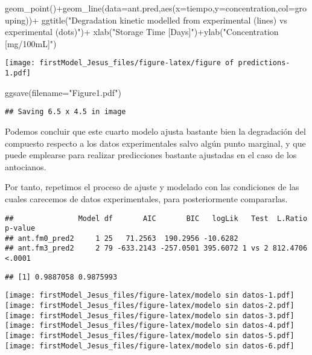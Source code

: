 \documentclass[
]{article}
\newenvironment{Shaded}{\begin{snugshade}}{\end{snugshade}}
\newcommand{\AttributeTok}[1]{\textcolor[rgb]{0.77,0.63,0.00}{#1}}
\newcommand{\FunctionTok}[1]{\textcolor[rgb]{0.00,0.00,0.00}{#1}}
\newcommand{\NormalTok}[1]{#1}
\newcommand{\SpecialCharTok}[1]{\textcolor[rgb]{0.00,0.00,0.00}{#1}}
\newcommand{\StringTok}[1]{\textcolor[rgb]{0.31,0.60,0.02}{#1}}
\begin{document}
\begin{Shaded}
\begin{Highlighting}[]
  \FunctionTok{geom\_point}\NormalTok{()}\SpecialCharTok{+}\FunctionTok{geom\_line}\NormalTok{(}\AttributeTok{data=}\NormalTok{ant.pred,}\FunctionTok{aes}\NormalTok{(}\AttributeTok{x=}\NormalTok{tiempo,}\AttributeTok{y=}\NormalTok{concentration,}\AttributeTok{col=}\NormalTok{grouping))}\SpecialCharTok{+}
  \FunctionTok{ggtitle}\NormalTok{(}\StringTok{"Degradation kinetic modelled from experimental (lines) vs experimental (dots)"}\NormalTok{)}\SpecialCharTok{+}
  \FunctionTok{xlab}\NormalTok{(}\StringTok{"Storage Time [Days]"}\NormalTok{)}\SpecialCharTok{+}\FunctionTok{ylab}\NormalTok{(}\StringTok{"Concentration [mg/100mL]"}\NormalTok{)}
\end{Highlighting}
\end{Shaded}

\texttt{[image: firstModel\_Jesus\_files/figure-latex/figure of predictions-1.pdf]}

\begin{Shaded}
\begin{Highlighting}[]
\FunctionTok{ggsave}\NormalTok{(}\AttributeTok{filename=}\StringTok{"Figure1.pdf"}\NormalTok{)}
\end{Highlighting}
\end{Shaded}

\begin{verbatim}
## Saving 6.5 x 4.5 in image
\end{verbatim}

Podemos concluir que este cuarto modelo ajusta bastante bien la
degradación del compuesto respecto a los datos experimentales salvo
algún punto marginal, y que puede emplearse para realizar predicciones
bastante ajustadas en el caso de los antocianos.

Por tanto, repetimos el proceso de ajuste y modelado con las condiciones
de las cuales carecemos de datos experimentales, para posteriormente
compararlas.

\begin{verbatim}
##               Model df       AIC       BIC   logLik   Test  L.Ratio p-value
## ant.fm0_pred2     1 25   71.2563  190.2956 -10.6282                        
## ant.fm3_pred2     2 79 -633.2143 -257.0501 395.6072 1 vs 2 812.4706  <.0001
\end{verbatim}

\begin{verbatim}
## [1] 0.9887058 0.9875993
\end{verbatim}

\texttt{[image: firstModel\_Jesus\_files/figure-latex/modelo sin datos-1.pdf]}
\texttt{[image: firstModel\_Jesus\_files/figure-latex/modelo sin datos-2.pdf]}
\texttt{[image: firstModel\_Jesus\_files/figure-latex/modelo sin datos-3.pdf]}
\texttt{[image: firstModel\_Jesus\_files/figure-latex/modelo sin datos-4.pdf]}
\texttt{[image: firstModel\_Jesus\_files/figure-latex/modelo sin datos-5.pdf]}
\texttt{[image: firstModel\_Jesus\_files/figure-latex/modelo sin datos-6.pdf]}
\end{document}
